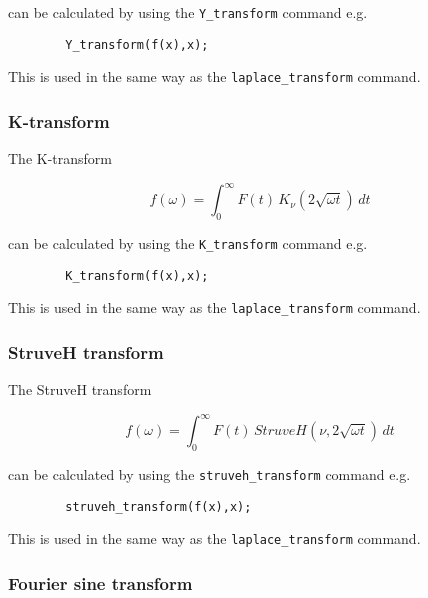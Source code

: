 can be calculated by using the \verb+Y_transform+ command e.g.

\begin{verbatim}
        Y_transform(f(x),x);
\end{verbatim}

This is used in the same way as the \verb+laplace_transform+ command.

\subsubsection{K-transform}
\hypertarget{operator:K_TRANSFORM}{}

The K-transform

\[
f(\omega) = \int_{0}^{\infty} F(t) \,K_{\nu}(2\sqrt{\omega t}) \,dt
\]

can be calculated by using the \verb+K_transform+ command e.g.

\begin{verbatim}
        K_transform(f(x),x);
\end{verbatim}

This is used in the same way as the \verb+laplace_transform+ command.

\subsubsection{StruveH transform}
\hypertarget{operator:STRUVEH_TRANSFORM}{}

The StruveH transform

\[
f(\omega) = \int_{0}^{\infty} F(t) \,StruveH(\nu,2\sqrt{\omega t}) \,dt
\]

can be calculated by using the \verb+struveh_transform+ command e.g.

\begin{verbatim}
        struveh_transform(f(x),x);
\end{verbatim}

This is used in the same way as the \verb+laplace_transform+ command.

\subsubsection{Fourier sine transform}
\hypertarget{operator:FOURIER_SIN}{}

